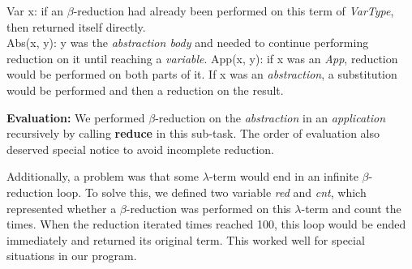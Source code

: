 \documentclass{article}
\begin{document}
\indent Var x: if an $\beta$-reduction had already been performed on this term of \emph{VarType}, then returned itself directly.\\
\indent Abs(x, y): y was the \emph{abstraction body} and needed to continue performing reduction on it until reaching a \emph{variable}.
\indent App(x, y): if x was an \emph{App}, reduction would be performed on both parts of it. If x was an \emph{abstraction}, a substitution would be performed and then a reduction on the result.

\textbf{Evaluation:} We performed $\beta$-reduction on the \emph{abstraction} in an \emph{application} recursively
 by calling \textbf{reduce} in this sub-task. The order of evaluation also deserved special notice to avoid incomplete reduction. 

Additionally, a problem was that some $\lambda$-term would end in an infinite $\beta$-reduction loop.
To solve this, we defined two variable \emph{red} and \emph{cnt}, which represented whether a $\beta$-reduction was performed on this $\lambda$-term and count the times. When the reduction iterated times reached 100, this loop would be ended immediately and returned its original term. This worked well for special situations in our program.








\end{document}
